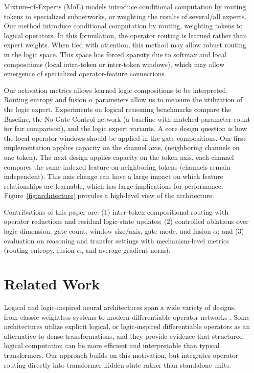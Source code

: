 \documentclass[10pt,twocolumn,letterpaper]{article}
\begin{document}
Mixture-of-Experts (MoE) models
\cite{6797059,shazeer2017outrageouslylargeneuralnetworks,fedus2022switchtransformersscalingtrillion}
introduce conditional computation by routing tokens to specialized subnetworks, or weighting
the results of several/all experts.
Our method introduce conditional computation by routing, weighting
tokens to logical operators. In this formulation,
the operator routing is learned rather than expert weights.
When tied with attention, this method may allow robust routing
in the logic space. This space has forced sparsity due to softmax
and local compositions (local intra-token or inter-token windows),
which may allow emergence of specialized operator-feature connections.

Our activation metrics allows learned logic compositions to be interpreted.
Routing entropy and fusion $\alpha$ parameters allow us to measure the
utilization of the logic expert. Experiments on logical
reasoning benchmarks compare the Baseline, the No-Gate Control network
(a baseline with matched parameter count for fair comparison), and the
logic expert variants.
A core design question is how the local operator windows should be applied in the
gate compositions. Our first implementation applies capacity on the channel axis,
(neighboring channels on one token). The next design applies
capacity on the token axis, each channel compares the same indexed feature on
neighboring tokens (channels remain independent). This axis change can have
a large impact on which feature relationships are learnable, which has
large implications for performance.
Figure~\ref{fig:architecture} provides a high-level view of the
architecture.

Contributions of this paper are: (1) inter-token compositional routing with
operator reductions and residual logic-state updates; (2) controlled ablations
over logic dimension, gate count, window size/axis, gate mode, and fusion
$\alpha$; and (3) evaluation on reasoning and transfer settings with
mechanism-level metrics (routing entropy, fusion $\alpha$, and average gradient norm).

\section{Related Work}

Logical and logic-inspired neural architectures span a wide variety of designs,
from classic weightless systems to modern differentiable operator networks
\cite{Aleksander2009ABI}.
Some architectures utilize explicit logical, or logic-inspired
differentiable operators \cite{petersen2022deepdifferentiablelogicgate} as an
alternative to dense transformations, and they provide evidence that structured
logical computation can be more efficient and interpretable than typical
transformers. Our approach builds on this motivation, but integrates operator routing
directly into transformer hidden-state rather than standalone units.
\end{document}
